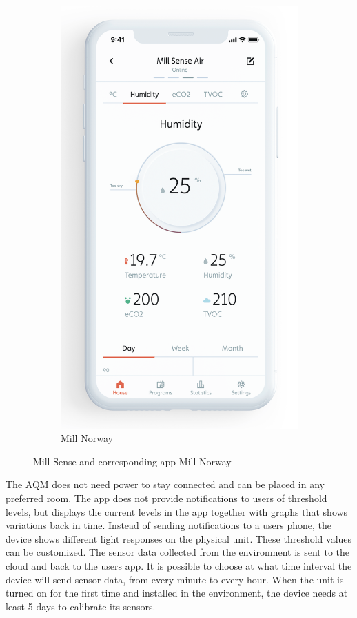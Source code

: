 \begin{figure} [H]
\begin{subfigure}{0.3\textwidth}
         \includegraphics[width=1\textwidth]{figures/MillSenseApp.png}
         \caption{Mill Norway \cite{MillSense}}
         \label{fig:MillSenseApp}
     \end{subfigure}
     \hfill
        \caption{Mill Sense and corresponding app Mill Norway}
        \label{fig:MillSenseBoth}
\end{figure}

The AQM does not need power to stay connected and can be placed in any preferred room. The app does not provide notifications to users of threshold levels, but displays the current levels in the app together with graphs that shows variations back in time. Instead of sending notifications to a users phone, the device shows different light responses on the physical unit. These threshold values can be customized. The sensor data collected from the environment is sent to the cloud and back to the users app. It is possible to choose at what time interval the device will send sensor data, from every minute to every hour. When the unit is turned on for the first time and installed in the environment, the device needs at least 5 days to calibrate its sensors. 


